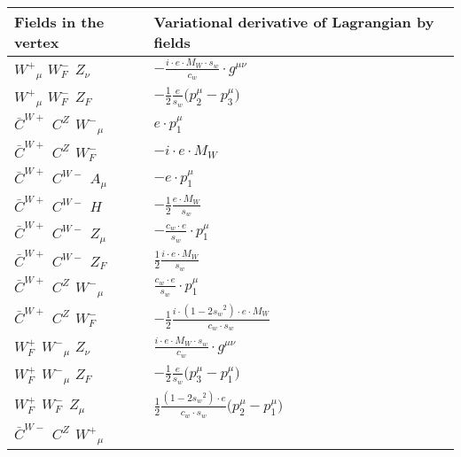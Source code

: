 \begin{center}
\begin{tabular}{|l|l|} \hline
Fields in the vertex & Variational derivative of Lagrangian by fields \\ \hline
$W^+{}_{\mu }$ \phantom{-} $W^-_F{}_{}$ \phantom{-} ${Z}_{\nu }$ \phantom{-}  &
	$-\frac{ i \cdot e \cdot M_W \cdot s_w}{ c_w}\cdot g^{\mu \nu} $\\[2mm]
$W^+{}_{\mu }$ \phantom{-} $W^-_F{}_{}$ \phantom{-} $Z_F{}_{}$ \phantom{-}  &
	$-\frac{1}{2}\frac{ e}{ s_w}\big(p_2^\mu -p_3^\mu \big)$\\[2mm]
$\bar{C}^{W+}{}_{}$ \phantom{-} $C^{Z}{}_{}$ \phantom{-} $W^-{}_{\mu }$ \phantom{-}  &
	$ e\cdot p_1^\mu $\\[2mm]
$\bar{C}^{W+}{}_{}$ \phantom{-} $C^{Z}{}_{}$ \phantom{-} $W^-_F{}_{}$ \phantom{-}  &
	$- i \cdot e \cdot M_W$\\[2mm]
$\bar{C}^{W+}{}_{}$ \phantom{-} $C^{W-}{}_{}$ \phantom{-} ${A}_{\mu }$ \phantom{-}  &
	$- e\cdot p_1^\mu $\\[2mm]
$\bar{C}^{W+}{}_{}$ \phantom{-} $C^{W-}{}_{}$ \phantom{-} ${H}_{}$ \phantom{-}  &
	$-\frac{1}{2}\frac{ e \cdot M_W}{ s_w}$\\[2mm]
$\bar{C}^{W+}{}_{}$ \phantom{-} $C^{W-}{}_{}$ \phantom{-} ${Z}_{\mu }$ \phantom{-}  &
	$-\frac{ c_w \cdot e}{ s_w}\cdot p_1^\mu $\\[2mm]
$\bar{C}^{W+}{}_{}$ \phantom{-} $C^{W-}{}_{}$ \phantom{-} $Z_F{}_{}$ \phantom{-}  &
	$\frac{1}{2}\frac{ i \cdot e \cdot M_W}{ s_w}$\\[2mm]
$\bar{C}^{W+}{}_{}$ \phantom{-} $C^{Z}{}_{}$ \phantom{-} $W^-{}_{\mu }$ \phantom{-}  &
	$\frac{ c_w \cdot e}{ s_w}\cdot p_1^\mu $\\[2mm]
$\bar{C}^{W+}{}_{}$ \phantom{-} $C^{Z}{}_{}$ \phantom{-} $W^-_F{}_{}$ \phantom{-}  &
	$-\frac{1}{2}\frac{ i \cdot (1-2 s_w {}^2) \cdot e \cdot M_W}{ c_w \cdot s_w}$\\[2mm]
$W^+_F{}_{}$ \phantom{-} $W^-{}_{\mu }$ \phantom{-} ${Z}_{\nu }$ \phantom{-}  &
	$\frac{ i \cdot e \cdot M_W \cdot s_w}{ c_w}\cdot g^{\mu \nu} $\\[2mm]
$W^+_F{}_{}$ \phantom{-} $W^-{}_{\mu }$ \phantom{-} $Z_F{}_{}$ \phantom{-}  &
	$-\frac{1}{2}\frac{ e}{ s_w}\big(p_3^\mu -p_1^\mu \big)$\\[2mm]
$W^+_F{}_{}$ \phantom{-} $W^-_F{}_{}$ \phantom{-} ${Z}_{\mu }$ \phantom{-}  &
	$\frac{1}{2}\frac{ (1-2 s_w {}^2) \cdot e}{ c_w \cdot s_w}\big(p_2^\mu -p_1^\mu \big)$\\[2mm]
$\bar{C}^{W-}{}_{}$ \phantom{-} $C^{Z}{}_{}$ \phantom{-} $W^+{}_{\mu }$ \phantom{-}  &

\end{tabular}
\end{center}
